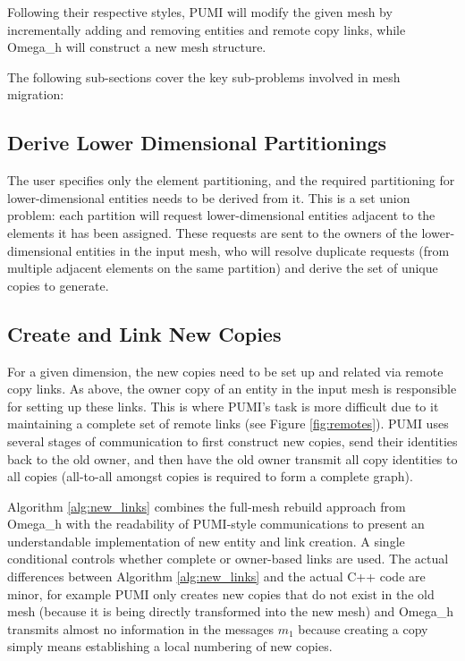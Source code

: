 Following their respective styles, PUMI will modify the given
mesh by incrementally adding and removing entities and remote
copy links,
while Omega\_h will construct a new mesh structure.

The following sub-sections cover the key sub-problems involved
in mesh migration:

\subsection{Derive Lower Dimensional Partitionings}
\label{sec:migr_down}

The user specifies only the element partitioning, and
the required partitioning for lower-dimensional entities needs to
be derived from it.
This is a set union problem: each partition will request lower-dimensional
entities adjacent to the elements it has been assigned.
These requests are sent to the owners of the lower-dimensional entities
in the input mesh, who will resolve duplicate requests (from multiple
adjacent elements on the same partition) and derive the set
of unique copies to generate.

\subsection{Create and Link New Copies}
\label{sec:migr_links}

For a given dimension, the new copies need to be set up
and related via remote copy links.
As above, the owner copy of an entity in the input mesh is responsible
for setting up these links.
This is where PUMI's task is more difficult due to it maintaining
a complete set of remote links (see Figure \ref{fig:remotes}).
PUMI uses several stages of communication to first construct
new copies, send their identities back to the old owner, and then
have the old owner transmit all copy identities to all copies (all-to-all
amongst copies is required to form a complete graph).

Algorithm \ref{alg:new_links} combines the full-mesh rebuild approach
from Omega\_h with the readability of PUMI-style communications to
present an understandable implementation of new entity and link creation.
A single conditional controls whether complete or owner-based
links are used.
The actual differences between Algorithm \ref{alg:new_links} and the
actual C++ code are minor, for example PUMI only creates new copies
that do not exist in the old mesh (because it is being directly
transformed into the new mesh) and Omega\_h transmits almost no
information in the messages $m_1$ because creating a copy simply
means establishing a local numbering of new copies.


